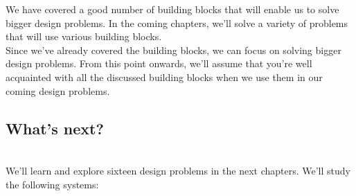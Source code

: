 

We have covered a good number of building blocks that will enable us to solve bigger design problems. In the coming chapters, we'll solve a variety of problems that will use various building blocks.
\\
Since we've already covered the building blocks, we can focus on solving bigger design problems. From this point onwards, we'll assume that you're well acquainted with all the discussed building blocks when we use them in our coming design problems.

\subsection{What's next?}\label{Y2Ox8zBBxg5qbUuXGUUMC}
\\
We'll learn and explore sixteen design problems in the next chapters. We'll study the following systems:

